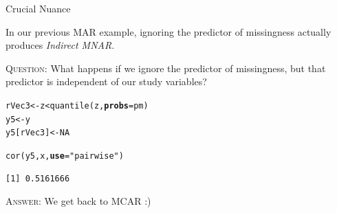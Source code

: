 \documentclass{beamer}\usepackage[]{graphicx}\usepackage[]{color}
\makeatletter
\newcommand{\hlnum}[1]{\textcolor[rgb]{0.69,0.494,0}{#1}}%
\newcommand{\hlstr}[1]{\textcolor[rgb]{0.749,0.012,0.012}{#1}}%
\newcommand{\hlopt}[1]{\textcolor[rgb]{0,0,0}{#1}}%
\newcommand{\hlstd}[1]{\textcolor[rgb]{0,0,0}{#1}}%
\newcommand{\hlkwb}[1]{\textcolor[rgb]{0,0.341,0.682}{#1}}%
\newcommand{\hlkwc}[1]{\textcolor[rgb]{0,0,0}{\textbf{#1}}}%
\newcommand{\hlkwd}[1]{\textcolor[rgb]{0.004,0.004,0.506}{#1}}%
\newenvironment{kframe}{%
 \def\at@end@of@kframe{}%
 \ifinner\ifhmode%
  \def\at@end@of@kframe{\end{minipage}}%
  \begin{minipage}{\columnwidth}%
 \fi\fi%
 \def\FrameCommand##1{\hskip\@totalleftmargin \hskip-\fboxsep
 \colorbox{shadecolor}{##1}\hskip-\fboxsep
     \hskip-\linewidth \hskip-\@totalleftmargin \hskip\columnwidth}%
 \MakeFramed {\advance\hsize-\width
   \@totalleftmargin\z@ \linewidth\hsize
   \@setminipage}}%
 {\par\unskip\endMakeFramed%
 \at@end@of@kframe}
\newenvironment{knitrout}{}{} %
\makeatother
\begin{document}

\begin{frame}[fragile]{Crucial Nuance}
  
  In our previous MAR example, ignoring the predictor of missingness actually 
  produces \emph{Indirect MNAR}.\\
  
  \pause
  \va
  
  \textsc{Question:} What happens if we ignore the predictor of missingness, but
  that predictor is independent of our study variables?
  
  \pause
  
\begin{knitrout}\footnotesize
{}\color{fgcolor}\begin{kframe}
\begin{alltt}
\hlstd{rVec3}     \hlkwb{<-} \hlstd{z} \hlopt{<} \hlkwd{quantile}\hlstd{(z,} \hlkwc{probs} \hlstd{= pm)}
\hlstd{y5}        \hlkwb{<-} \hlstd{y}
\hlstd{y5[rVec3]} \hlkwb{<-} \hlnum{NA}

\hlkwd{cor}\hlstd{(y5, x,} \hlkwc{use} \hlstd{=} \hlstr{"pairwise"}\hlstd{)}
\end{alltt}
\begin{verbatim}
[1] 0.5161666
\end{verbatim}
\end{kframe}
\end{knitrout}

\textsc{Answer:} We get back to MCAR :)

\end{frame}

\end{document}
